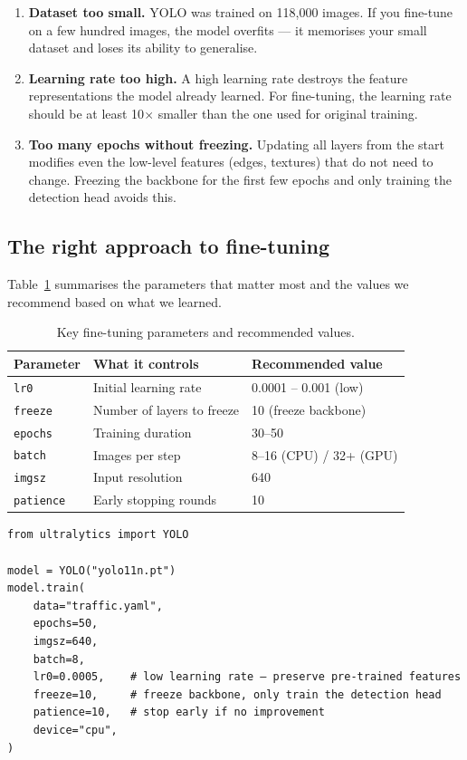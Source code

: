 \documentclass[12pt,a4paper,leqno]{report}
\begin{document}
\begin{enumerate}[label=\arabic*.]
  \item \textbf{Dataset too small.} YOLO was trained on 118,000 images. If you fine-tune on a few hundred images, the model overfits — it memorises your small dataset and loses its ability to generalise.
  \item \textbf{Learning rate too high.} A high learning rate destroys the feature representations the model already learned. For fine-tuning, the learning rate should be at least 10$\times$ smaller than the one used for original training.
  \item \textbf{Too many epochs without freezing.} Updating all layers from the start modifies even the low-level features (edges, textures) that do not need to change. Freezing the backbone for the first few epochs and only training the detection head avoids this.
\end{enumerate}

\subsection{The right approach to fine-tuning}

Table~\ref{tab:finetune} summarises the parameters that matter most and the values we recommend based on what we learned.

\begin{table}[H]
  \centering
  \caption{Key fine-tuning parameters and recommended values.}
  \label{tab:finetune}
  \begin{tabular}{lll}
    \toprule
    \textbf{Parameter} & \textbf{What it controls} & \textbf{Recommended value}\\
    \midrule
    \texttt{lr0} & Initial learning rate & 0.0001 -- 0.001 (low)\\
    \texttt{freeze} & Number of layers to freeze & 10 (freeze backbone)\\
    \texttt{epochs} & Training duration & 30--50\\
    \texttt{batch} & Images per step & 8--16 (CPU) / 32+ (GPU)\\
    \texttt{imgsz} & Input resolution & 640\\
    \texttt{patience} & Early stopping rounds & 10\\
    \bottomrule
  \end{tabular}
\end{table}

\begin{lstlisting}[caption=Recommended fine-tuning configuration.]
from ultralytics import YOLO

model = YOLO("yolo11n.pt")
model.train(
    data="traffic.yaml",
    epochs=50,
    imgsz=640,
    batch=8,
    lr0=0.0005,    # low learning rate — preserve pre-trained features
    freeze=10,     # freeze backbone, only train the detection head
    patience=10,   # stop early if no improvement
    device="cpu",
)
\end{lstlisting}
\end{document}
